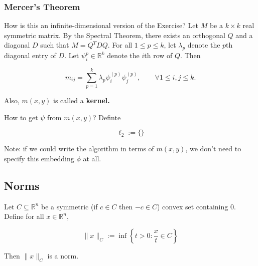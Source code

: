 \subsubsection{Mercer's Theorem}

How is this an infinite-dimensional version of the Exercise? Let \(M\) be a \(k \times k\) real symmetric matrix. By the Spectral Theorem, there exists an orthogonal \(Q\) and a diagonal \(D\) such that \(M = Q^T D Q\). For all \(1 \leq p \leq k\), let \(\lambda_p\) denote the \(p\)th diagonal entry of \(D\). Let \(\psi_i^{p} \in \mathbb{R}^k\) denote the \(i\)th row of \(Q\). Then

\[
m_{ij} = \sum_{p=1}^k \lambda_p \psi_i^{(p)} \psi_j^{(p)}, \qquad \forall 1 \leq i, j \leq k.
\]

Also, \(m(x,y)\) is called a \textbf{kernel.}

How to get \(\psi\) from \(m(x,y)\)? Definte 

\[
\ell_2 := \{ \} 
\]

Note: if we could write the algorithm in terms of \(m(x,y)\), we don't need to specify this embedding \(\phi\) at all. 

\subsection{Norms}

\begin{proposition}

Let \(C \subseteq \mathbb{R}^n\) be a symmetric (if \(c \in C\) then \(-c \in C\)) convex set containing 0. Define for all \(x \in \mathbb{R}^n\), 

\[
 \lVert x \rVert_C := \inf \left\{  t > 0: \frac{x}{t} \in C \right\}
\]

Then \( \lVert x \rVert_C\) is a norm.

\end{proposition}

%
%
%
%
%
%
%
%
%

%
%
%
